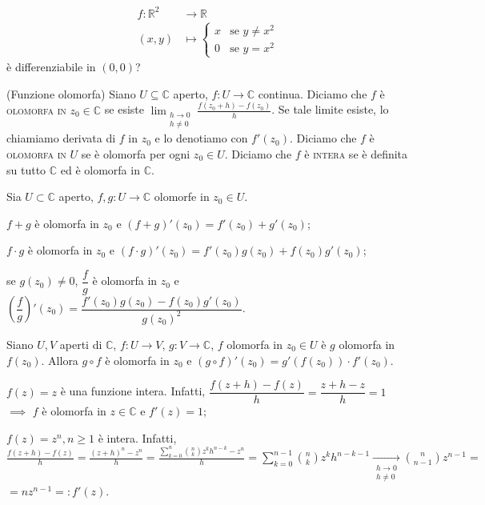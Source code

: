 \begin{exc}
  \begin{align*}
    f:\mathbb{R}^2 &\longrightarrow \mathbb{R}\\
    (x, y) &\longmapsto \begin{cases} x & \mbox{se }y\not=x^2 \\ 0 & \mbox{se }y=x^2 \end{cases}
  \end{align*}
  è differenziabile in $(0, 0)$?
\end{exc}

\begin{defn}
  (Funzione olomorfa) Siano $U \subseteq \mathbb{C}$ aperto, $f:U \longrightarrow \mathbb{C}$ continua. Diciamo che $f$ è \textsc{olomorfa in $z_0 \in \mathbb{C}$} se esiste $\displaystyle \lim_{\substack{h \longrightarrow 0 \\ h\not=0}} \frac{f(z_0+h)-f(z_0)}{h}$. Se tale limite esiste, lo chiamiamo derivata di $f$ in $z_0$ e lo denotiamo con $f'(z_0)$.
  Diciamo che $f$ è \textsc{olomorfa in $U$} se è olomorfa per ogni $z_0 \in U$. Diciamo che $f$ è \textsc{intera} se è definita su tutto $\mathbb{C}$ ed è olomorfa in $\mathbb{C}$.
\end{defn}

\begin{prop}
  Sia $U \subset \mathbb{C}$ aperto, $f, g:U \longrightarrow \mathbb{C}$ olomorfe in $z_0 \in U$.
  \begin{nlist}
    \item $f+g$ è olomorfa in $z_0$ e $(f+g)'(z_0)=f'(z_0)+g'(z_0)$;
    \item $f \cdot g$ è olomorfa in $z_0$ e $(f \cdot g)'(z_0)=f'(z_0)g(z_0)+f(z_0)g'(z_0)$;
    \item se $g(z_0) \not=0$, $\dfrac{f}{g}$ è olomorfa in $z_0$ e $\left(\dfrac{f}{g}\right)'(z_0)=\dfrac{f'(z_0)g(z_0)-f(z_0)g'(z_0)}{g(z_0)^2}$.
  \end{nlist}
\end{prop}

\begin{prop}
  Siano $U, V$ aperti di $\mathbb{C}$, $f:U \longrightarrow V$, $g:V \longrightarrow \mathbb{C}$, $f$ olomorfa in $z_0 \in U$ è $g$ olomorfa in $f(z_0)$. Allora $g \circ f$ è olomorfa in $z_0$ e $(g \circ f)'(z_0)=g'(f(z_0))\cdot f'(z_0)$.
\end{prop}

\begin{ex}
  \begin{nlist}
    \item $f(z)=z$ è una funzione intera. Infatti, $\dfrac{f(z+h)-f(z)}{h}=\dfrac{z+h-z}{h}=1$ $\implies$ $f$ è olomorfa in $z \in \mathbb{C}$ e $f'(z)=1$;
    \item $f(z)=z^n, n \ge 1$ è intera.
    Infatti, $\displaystyle \frac{f(z+h)-f(z)}{h}=\frac{(z+h)^n-z^n}{h}=\frac{\sum_{k=0}^n \binom{n}{k}z^kh^{n-k}-z^n}{h}=\sum_{k=0}^{n-1} \binom{n}{k}z^kh^{n-k-1} \xrightarrow[\substack{h \longrightarrow 0 \\ h\not=0}]{} \binom{n}{n-1} z^{n-1}=$\\
    $=nz^{n-1}=:f'(z)$.
  \end{nlist}
\end{ex}


